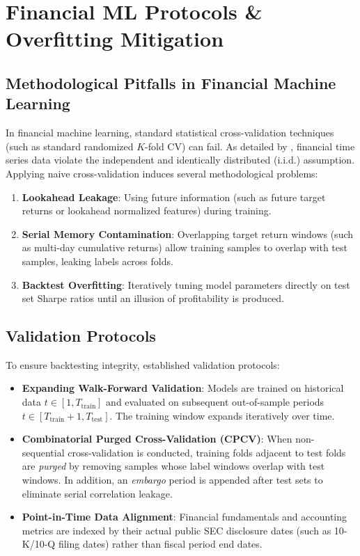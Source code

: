\section{Financial ML Protocols \& Overfitting Mitigation}

\subsection{Methodological Pitfalls in Financial Machine Learning}
In financial machine learning, standard statistical cross-validation techniques (such as standard randomized $K$-fold CV) can fail. As detailed by \citet{lopez2018advances}, financial time series data violate the independent and identically distributed (i.i.d.) assumption. Applying naive cross-validation induces several methodological problems:
\begin{enumerate}
    \item \textbf{Lookahead Leakage}: Using future information (such as future target returns or lookahead normalized features) during training.
    \item \textbf{Serial Memory Contamination}: Overlapping target return windows (such as multi-day cumulative returns) allow training samples to overlap with test samples, leaking labels across folds.
    \item \textbf{Backtest Overfitting}: Iteratively tuning model parameters directly on test set Sharpe ratios until an illusion of profitability is produced.
\end{enumerate}

\subsection{Validation Protocols}
To ensure backtesting integrity, \citet{lopez2018advances} established validation protocols:
\begin{itemize}
    \item \textbf{Expanding Walk-Forward Validation}: Models are trained on historical data $t \in [1, T_{\text{train}}]$ and evaluated on subsequent out-of-sample periods $t \in [T_{\text{train}}+1, T_{\text{test}}]$. The training window expands iteratively over time.
    \item \textbf{Combinatorial Purged Cross-Validation (CPCV)}: When non-sequential cross-validation is conducted, training folds adjacent to test folds are \emph{purged} by removing samples whose label windows overlap with test windows. In addition, an \emph{embargo} period is appended after test sets to eliminate serial correlation leakage.
    \item \textbf{Point-in-Time Data Alignment}: Financial fundamentals and accounting metrics are indexed by their actual public SEC disclosure dates (such as 10-K/10-Q filing dates) rather than fiscal period end dates.
\end{itemize}

